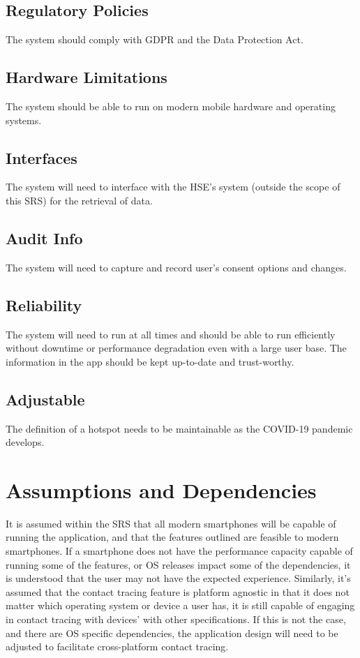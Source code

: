 \documentclass{scrreprt}
\begin{document}
\subsection{Regulatory Policies}
The system should comply with GDPR and the Data Protection Act.

\subsection{Hardware Limitations}
The system should be able to run on modern mobile hardware and operating systems.

\subsection{Interfaces}
The system will need to interface with the HSE's system (outside the scope of this SRS) for the retrieval of data.

\subsection{Audit Info}
The system will need to capture and record user's consent options and changes.

\subsection{Reliability}
The system will need to run at all times and should be able to run efficiently without downtime or performance degradation even with a large user base. The information in the app should be kept up-to-date and trust-worthy.

\subsection{Adjustable}
The definition of a hotspot needs to be maintainable as the COVID-19 pandemic develops.


\section{Assumptions and Dependencies}
It is assumed within the SRS that all modern smartphones will be capable of running the application, and that the features outlined are feasible to modern smartphones. If a smartphone does not have the performance capacity capable of running some of the features, or OS releases impact some of the dependencies, it is understood that the user may not have the expected experience. Similarly, it's assumed that the contact tracing feature is platform agnostic in that it does not matter which operating system or device a user has, it is still capable of engaging in contact tracing with devices' with other specifications. If this is not the case, and there are OS specific dependencies, the application design will need to be adjusted to facilitate cross-platform contact tracing.
\end{document}
